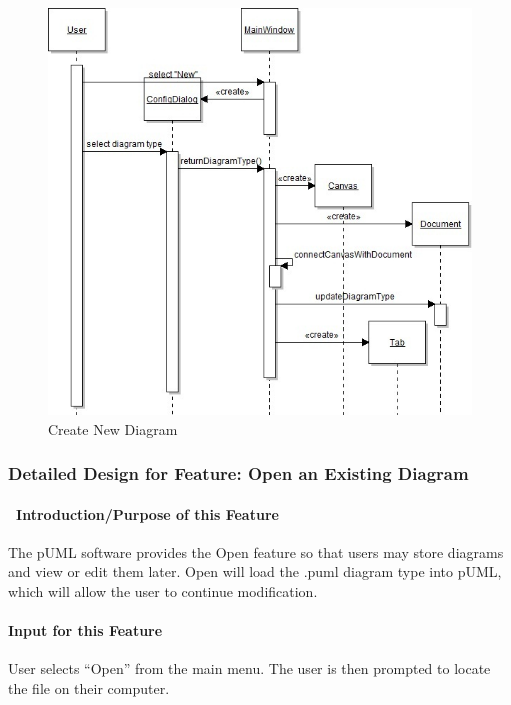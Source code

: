 \documentclass[twoside,letterpaper]{article}
\begin{document}
{\begin{figure}[h]
\centering
\includegraphics[width=6.0in]{IntNewDiagram.jpg}
\caption{Create New Diagram}
\end{figure}
\clearpage



% 
%

\subsubsection{Detailed Design for Feature: Open an Existing Diagram }
\paragraph[\ Introduction/Purpose of this Feature]
{\ Introduction/Purpose of this Feature}
{
The pUML software provides the Open feature so that users may store diagrams and view or edit them later.  Open will load the .puml diagram type into pUML, which will allow the user to continue modification.
}

\paragraph[Input for this Feature]{Input for this Feature}
{
User selects ``Open'' from the main menu.  The user is then prompted to locate the file on their computer.
}

}
\end{document}
